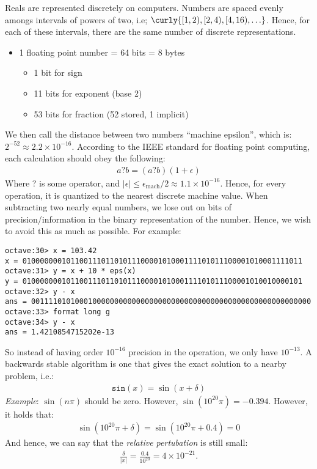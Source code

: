 \documentclass{article}
\begin{document}
Reals are represented discretely on computers. Numbers are spaced evenly amongs intervals
of powers of two, i.e; $\curly{[1,2), [2, 4), [4, 16), \ldots}$. Hence, for each of these intervals, there are the same number of discrete representations.
\gap
{}
\begin{itemize}
\item 1 floating point number = 64 bits = 8 bytes
  \begin{itemize}
  \item 1 bit for sign
  \item 11 bits for exponent (base 2)
  \item 53 bits for fraction (52 stored, 1 implicit)
  \end{itemize}
\end{itemize}
We then call the distance between two numbers ``machine epsilon'', which is:
$2^{-52} \approx 2.2 \times 10^{-16}$.
\gap
{} According to the IEEE standard for floating point computing,
each calculation should obey the following:
\begin{align*}
  a ? b = (a ? b)(1 + \epsilon)
\end{align*}
Where ? is some operator, and $|\epsilon| \leq \epsilon_\text{mach} / 2 \approx 1.1 \times 10^{-16}$. Hence, for every operation, it is quantized to the nearest discrete machine value.
\gap
{} When subtracting two nearly equal numbers,
we lose out on bits of precision/information in the binary representation of the number.
Hence, we wish to avoid this as much as possible. For example:
\begin{verbatim}
octave:30> x = 103.42
x = 0100000001011001110110101110000101000111101011100001010001111011
octave:31> y = x + 10 * eps(x)
y = 0100000001011001110110101110000101000111101011100001010010000101
octave:32> y - x
ans = 0011110101000100000000000000000000000000000000000000000000000000
octave:33> format long g
octave:34> y - x
ans = 1.4210854715202e-13
\end{verbatim}
So instead of having order $10^{-16}$ precision in the operation, we only have $10^{-13}$.
\gap
{} A backwards stable algorithm is one that gives the exact solution to a nearby problem, i.e.:
\begin{align*}
  \texttt{sin}(x) = \sin(x + \delta)
\end{align*}
\textit{Example}: $\sin(n \pi)$ should be zero. However, $\sin(10^{20} \pi) = -0.394$.
However, it holds that:
\begin{align*}
  \sin(10^{20} \pi + \delta) = \sin(10^{20} \pi + 0.4) = 0
\end{align*}
And hence, we can say that the \textit{relative pertubation} is still small:
\begin{align*}
  \frac{\delta}{|x|} = \frac{0.4}{10^{20}} = 4\times 10^{-21}.
\end{align*}
\end{document}
